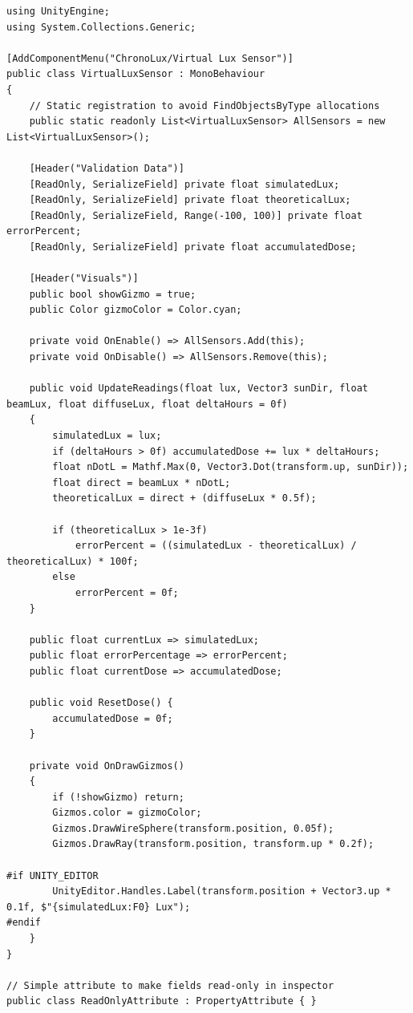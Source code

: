 \begin{lstlisting}[language={[Sharp]C}, caption={VirtualLuxSensor.cs: Provides ground-truth telemetry comparison via theoretical light accumulation.}, label={lst:virtualluxsensor}]
using UnityEngine;
using System.Collections.Generic;

[AddComponentMenu("ChronoLux/Virtual Lux Sensor")]
public class VirtualLuxSensor : MonoBehaviour
{
    // Static registration to avoid FindObjectsByType allocations
    public static readonly List<VirtualLuxSensor> AllSensors = new List<VirtualLuxSensor>();

    [Header("Validation Data")]
    [ReadOnly, SerializeField] private float simulatedLux;
    [ReadOnly, SerializeField] private float theoreticalLux;
    [ReadOnly, SerializeField, Range(-100, 100)] private float errorPercent;
    [ReadOnly, SerializeField] private float accumulatedDose;

    [Header("Visuals")]
    public bool showGizmo = true;
    public Color gizmoColor = Color.cyan;

    private void OnEnable() => AllSensors.Add(this);
    private void OnDisable() => AllSensors.Remove(this);

    public void UpdateReadings(float lux, Vector3 sunDir, float beamLux, float diffuseLux, float deltaHours = 0f)
    {
        simulatedLux = lux;
        if (deltaHours > 0f) accumulatedDose += lux * deltaHours;
        float nDotL = Mathf.Max(0, Vector3.Dot(transform.up, sunDir));
        float direct = beamLux * nDotL;
        theoreticalLux = direct + (diffuseLux * 0.5f); 

        if (theoreticalLux > 1e-3f)
            errorPercent = ((simulatedLux - theoreticalLux) / theoreticalLux) * 100f;
        else
            errorPercent = 0f;
    }

    public float currentLux => simulatedLux;
    public float errorPercentage => errorPercent;
    public float currentDose => accumulatedDose;

    public void ResetDose() {
        accumulatedDose = 0f;
    }

    private void OnDrawGizmos()
    {
        if (!showGizmo) return;
        Gizmos.color = gizmoColor;
        Gizmos.DrawWireSphere(transform.position, 0.05f);
        Gizmos.DrawRay(transform.position, transform.up * 0.2f);
        
#if UNITY_EDITOR
        UnityEditor.Handles.Label(transform.position + Vector3.up * 0.1f, $"{simulatedLux:F0} Lux");
#endif
    }
}

// Simple attribute to make fields read-only in inspector
public class ReadOnlyAttribute : PropertyAttribute { }
\end{lstlisting}

